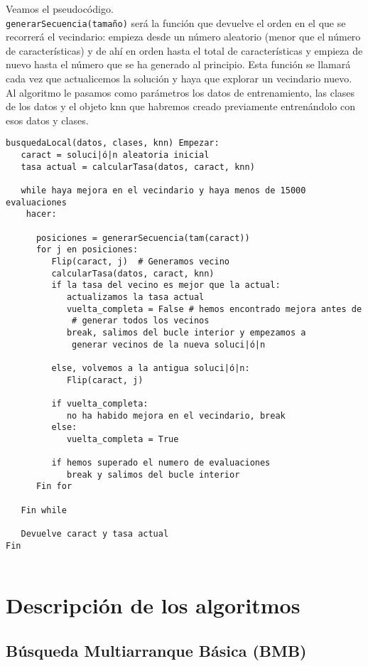 \documentclass[12pt]{article}
\begin{document}
Veamos el pseudocódigo.\\
\texttt{generarSecuencia(tamaño)} será la función que devuelve el orden en el que se recorrerá el vecindario: empieza desde un número aleatorio (menor que el número de características) y de ahí en orden hasta el total de características y empieza de nuevo hasta el número que se ha generado al principio. Esta función se llamará cada vez que actualicemos la solución y haya que explorar un vecindario nuevo.\\
Al algoritmo le pasamos como parámetros los datos de entrenamiento, las clases de los datos y el objeto knn que habremos creado previamente entrenándolo con esos datos y clases.
\begin{lstlisting}
busquedaLocal(datos, clases, knn) Empezar:
   caract = soluci|ó|n aleatoria inicial
   tasa actual = calcularTasa(datos, caract, knn)
   
   while haya mejora en el vecindario y haya menos de 15000 evaluaciones
    hacer:
      
      posiciones = generarSecuencia(tam(caract))
      for j en posiciones:
         Flip(caract, j)  # Generamos vecino
         calcularTasa(datos, caract, knn)
         if la tasa del vecino es mejor que la actual:
            actualizamos la tasa actual
            vuelta_completa = False # hemos encontrado mejora antes de
             # generar todos los vecinos
            break, salimos del bucle interior y empezamos a 
             generar vecinos de la nueva soluci|ó|n
         
         else, volvemos a la antigua soluci|ó|n:
            Flip(caract, j)
            
         if vuelta_completa:
            no ha habido mejora en el vecindario, break
         else:
            vuelta_completa = True
         
         if hemos superado el numero de evaluaciones
            break y salimos del bucle interior
      Fin for
   
   Fin while
   
   Devuelve caract y tasa actual
Fin
   
\end{lstlisting}

\newpage

\section{Descripción de los algoritmos}

\subsection{Búsqueda Multiarranque Básica (BMB)}
\end{document}
